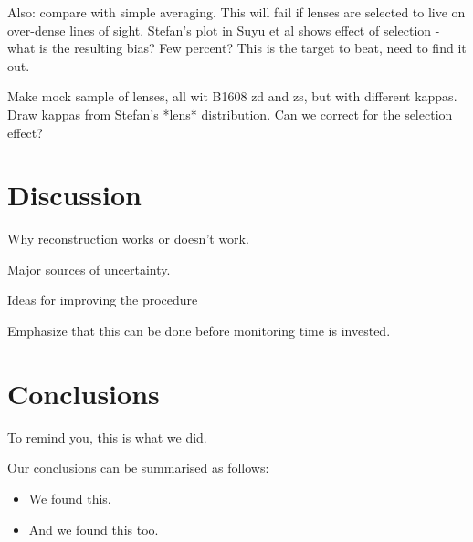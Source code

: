 \documentclass[useAMS,usenatbib]{mn2e}
\begin{document}
Also: compare with simple averaging. This will fail if lenses are selected to
live on over-dense lines of sight. Stefan's plot in Suyu et al shows effect of
selection - what is the resulting bias? Few percent? This is the target to beat,
need to find it out.

Make mock sample of lenses, all wit B1608 zd and zs, but with different kappas.
Draw kappas from Stefan's *lens* distribution. Can we correct for the selection
effect?





\section{Discussion}
\label{sec:discuss}

Why reconstruction works or doesn't work.

Major sources of uncertainty.

Ideas for improving the procedure

Emphasize that this can be done before monitoring time is invested.



\section{Conclusions}
\label{sec:conclude}

To remind you, this is what we did.

Our conclusions can be summarised as follows:

\begin{itemize}

\item We found this.

\item And we found this too.

\end{itemize}

\end{document}
